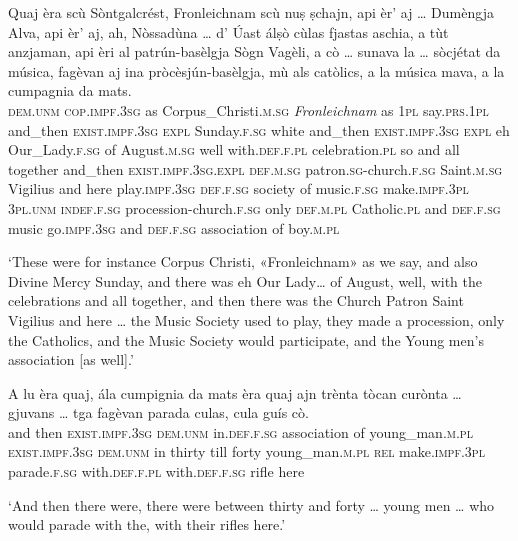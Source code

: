 \begin{linenumbers}
\gll    Quaj èra scù Sòntgalcrést, Fronleichnam scù nuṣ ṣchajn, api èr' aj … Dumèngja Alva, api  èr’ aj, ah, Nòssadùna … d’ Úast álṣò cùlas fjastas aschia, a tùt anzjaman, api èri al patrún-basèlgja Sògn Vagèli, a cò … sunava la … sòcjétat da música, fagèvan aj ina pròcèsjún-basèlgja, mù als catòlics, a la música mava, a la cumpagnia da mats.\\
\textsc{dem.unm} \textsc{cop.impf.3sg} as  Corpus\_Christi.\textsc{m.sg} \textit{Fronleichnam}\footnotemark{} as \textsc{1pl} say.\textsc{prs.1pl} and\_then \textsc{exist.impf.3sg} \textsc{expl} {} Sunday.\textsc{f.sg} white and\_then \textsc{exist.impf.3sg} \textsc{expl} eh Our\_Lady.\textsc{f.sg} {} of August.\textsc{m.sg} well with.\textsc{def.f.pl} celebration.\textsc{pl} so and all together and\_then \textsc{exist.impf.3sg.expl} \textsc{def.m.sg} patron.\textsc{sg}-church.\textsc{f.sg} Saint.\textsc{m.sg} Vigilius and here {} play.\textsc{impf.3sg} \textsc{def.f.sg} {} society of music.\textsc{f.sg} make.\textsc{impf.3pl} \textsc{3pl.unm} \textsc{indef.f.sg} procession-church.\textsc{f.sg} only \textsc{def.m.pl} Catholic.\textsc{pl} and \textsc{def.f.sg} music  go.\textsc{impf.3sg} and \textsc{def.f.sg} association of boy.\textsc{m.pl}\\
\end{linenumbers}
\medskip
\glt `These were for instance Corpus Christi, «Fronleichnam» as we say, and also Divine Mercy Sunday, and there was eh Our Lady… of August, well, with the celebrations and all together, and then there was the Church Patron Saint Vigilius and here … the Music Society used to play, they made a procession, only the Catholics, and the Music Society would participate, and the Young men's association [as well].'
\medskip

\begin{linenumbers}
\gll    A lu èra quaj, ála cumpignia da mats èra quaj ajn trènta tòcan curònta … gjuvans … tga fagèvan parada culas, cula guís cò.\\
and then \textsc{exist.impf.3sg} \textsc{dem.unm} in.\textsc{def.f.sg} association of young\_man.\textsc{m.pl} \textsc{exist.impf.3sg} \textsc{dem.unm} in thirty till forty {} young\_man.\textsc{m.pl} {} \textsc{rel} make.\textsc{impf.3pl}  parade.\textsc{f.sg} with.\textsc{def.f.pl} with.\textsc{def.f.sg} rifle here \\
\end{linenumbers}
\medskip
\glt `And then there were, there were between thirty and forty … young men … who would parade with the, with their rifles here.'
\medskip

